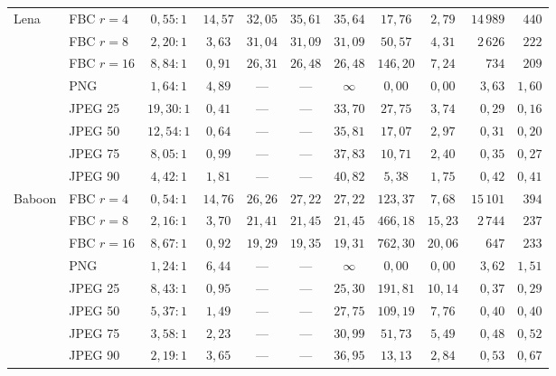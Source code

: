\documentclass[a4paper]{llncs}
\begin{document}
\begin{table}[htbp]
\begin{tabular}{llcccccccrr}
        Lena       & FBC $r{=}4$  & $0,55{:}1$  & $14,57$ & $32,05$ & $35,61$ & $35,64$ & $17,76$   & $2,79$  & $14\,989$ & $440$   \\
                   & FBC $r{=}8$  & $2,20{:}1$  & $3,63$  & $31,04$ & $31,09$ & $31,09$ & $50,57$   & $4,31$  & $2\,626$  & $222$   \\
                   & FBC $r{=}16$ & $8,84{:}1$  & $0,91$  & $26,31$ & $26,48$ & $26,48$ & $146,20$  & $7,24$  & $734$     & $209$   \\
                   & PNG          & $1,64{:}1$  & $4,89$  & ---     & ---     & $\infty$ & $0,00$   & $0,00$  & $3,63$    & $1,60$  \\
                   & JPEG 25      & $19,30{:}1$ & $0,41$  & ---     & ---     & $33,70$ & $27,75$   & $3,74$  & $0,29$    & $0,16$  \\
                   & JPEG 50      & $12,54{:}1$ & $0,64$  & ---     & ---     & $35,81$ & $17,07$   & $2,97$  & $0,31$    & $0,20$  \\
                   & JPEG 75      & $8,05{:}1$  & $0,99$  & ---     & ---     & $37,83$ & $10,71$   & $2,40$  & $0,35$    & $0,27$  \\
                   & JPEG 90      & $4,42{:}1$  & $1,81$  & ---     & ---     & $40,82$ & $5,38$    & $1,75$  & $0,42$    & $0,41$  \\
        \midrule

        Baboon     & FBC $r{=}4$  & $0,54{:}1$  & $14,76$ & $26,26$ & $27,22$ & $27,22$ & $123,37$  & $7,68$  & $15\,101$ & $394$   \\
                   & FBC $r{=}8$  & $2,16{:}1$  & $3,70$  & $21,41$ & $21,45$ & $21,45$ & $466,18$  & $15,23$ & $2\,744$  & $237$   \\
                   & FBC $r{=}16$ & $8,67{:}1$  & $0,92$  & $19,29$ & $19,35$ & $19,31$ & $762,30$  & $20,06$ & $647$     & $233$   \\
                   & PNG          & $1,24{:}1$  & $6,44$  & ---     & ---     & $\infty$ & $0,00$   & $0,00$  & $3,62$    & $1,51$  \\
                   & JPEG 25      & $8,43{:}1$  & $0,95$  & ---     & ---     & $25,30$ & $191,81$  & $10,14$ & $0,37$    & $0,29$  \\
                   & JPEG 50      & $5,37{:}1$  & $1,49$  & ---     & ---     & $27,75$ & $109,19$  & $7,76$  & $0,40$    & $0,40$  \\
                   & JPEG 75      & $3,58{:}1$  & $2,23$  & ---     & ---     & $30,99$ & $51,73$   & $5,49$  & $0,48$    & $0,52$  \\
                   & JPEG 90      & $2,19{:}1$  & $3,65$  & ---     & ---     & $36,95$ & $13,13$   & $2,84$  & $0,53$    & $0,67$  \\
        \midrule


\end{tabular}
\end{table}
\end{document}
